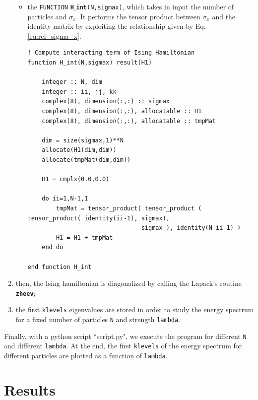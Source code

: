 \documentclass[rmp,10pt,onecolumn,fleqn,notitlepage]{revtex4-1}
\begin{document}
\begin{enumerate}
\begin{itemize}
\item the \texttt{FUNCTION} {\bfseries\texttt{H$\_$int}}\texttt{(N,sigmax)}, which takes in input the number of particles and \( \sigma _x \). It performs the tensor product between \( \sigma _x \) and the identity matrix by exploiting the relationship given by Eq. \eqref{eq:rel_sigma_x}.

\begin{minipage}[t]{0.98\linewidth}%
\begin{lstlisting}[style=Fortran]
! Compute interacting term of Ising Hamiltonian
function H_int(N,sigmax) result(H1)

    integer :: N, dim
    integer :: ii, jj, kk
    complex(8), dimension(:,:) :: sigmax
    complex(8), dimension(:,:), allocatable :: H1
    complex(8), dimension(:,:), allocatable :: tmpMat

    dim = size(sigmax,1)**N
    allocate(H1(dim,dim))
    allocate(tmpMat(dim,dim))

    H1 = cmplx(0.0,0.0)

    do ii=1,N-1,1
        tmpMat = tensor_product( tensor_product ( tensor_product( identity(ii-1), sigmax),
                                sigmax ), identity(N-ii-1) )
        H1 = H1 + tmpMat
    end do

end function H_int\end{lstlisting}
\end{minipage}


\end{itemize}


\item then, the Ising hamiltonian is diagonalized by calling the Lapack's routine {\bfseries\texttt{zheev}};

\item the first \texttt{klevels} eigenvalues are stored in order to study the energy spectrum for a fixed number of particles \texttt{N} and strength \texttt{lambda}.


\end{enumerate}

Finally, with a python script “script.py", we execute the program for different \texttt{N} and different \texttt{lambda}. At the end, the first \texttt{klevels} of the energy spectrum for different particles are plotted as a function of \texttt{lambda}.



\section{Results}
\end{document}

